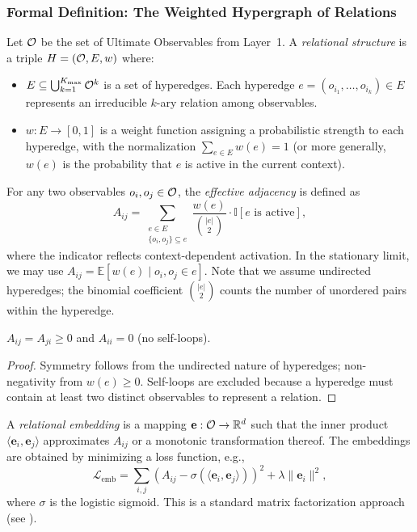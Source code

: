 \subsubsection{Formal Definition: The Weighted Hypergraph of Relations}
\begin{definition}
Let $\mathcal{O}$ be the set of Ultimate Observables from Layer~1. A \emph{relational structure} is a triple $H = (\mathcal{O}, E, w)$ where:
\begin{itemize}
    \item $E \subseteq \bigcup_{k=1}^{K_{\max}} \mathcal{O}^k$ is a set of hyperedges. Each hyperedge $e = (o_{i_1}, \dots, o_{i_k}) \in E$ represents an irreducible $k$-ary relation among observables.
    \item $w: E \to [0,1]$ is a weight function assigning a probabilistic strength to each hyperedge, with the normalization $\sum_{e \in E} w(e) = 1$ (or more generally, $w(e)$ is the probability that $e$ is active in the current context).
\end{itemize}
\end{definition}

\begin{definition}
For any two observables $o_i, o_j \in \mathcal{O}$, the \emph{effective adjacency} is defined as
\[
A_{ij} = \sum_{\substack{e \in E \\ \{o_i, o_j\} \subseteq e}} \frac{w(e)}{\binom{|e|}{2}} \cdot \mathbb{I}[\text{$e$ is active}],
\]
where the indicator reflects context-dependent activation. In the stationary limit, we may use $A_{ij} = \mathbb{E}[w(e) \mid o_i, o_j \in e]$. Note that we assume undirected hyperedges; the binomial coefficient $\binom{|e|}{2}$ counts the number of unordered pairs within the hyperedge.
\end{definition}

\begin{lemma}
$A_{ij} = A_{ji} \ge 0$ and $A_{ii} = 0$ (no self-loops).
\end{lemma}
\begin{proof}
Symmetry follows from the undirected nature of hyperedges; non-negativity from $w(e) \ge 0$. Self-loops are excluded because a hyperedge must contain at least two distinct observables to represent a relation.
\end{proof}

\begin{definition}
A \emph{relational embedding} is a mapping $\mathbf{e}: \mathcal{O} \to \mathbb{R}^d$ such that the inner product $\langle \mathbf{e}_i, \mathbf{e}_j \rangle$ approximates $A_{ij}$ or a monotonic transformation thereof. The embeddings are obtained by minimizing a loss function, e.g.,
\[
\mathcal{L}_{\text{emb}} = \sum_{i,j} \left( A_{ij} - \sigma(\langle \mathbf{e}_i, \mathbf{e}_j \rangle) \right)^2 + \lambda \|\mathbf{e}_i\|^2,
\]
where $\sigma$ is the logistic sigmoid. This is a standard matrix factorization approach (see \cite{pennington2014glove}).
\end{definition}

